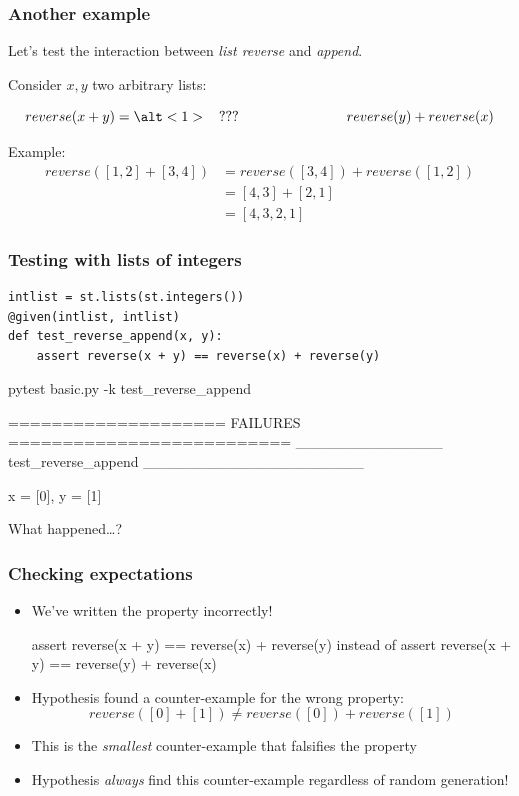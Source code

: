 \documentclass{beamer}
\begin{document}
\begin{frame}
  \frametitle{Another example}

  Let's test the interaction between \emph{list reverse}
  and \emph{append}.
  
  Consider $x, y$ two arbitrary lists:

  \[  reverse(x + y) = \alt<1>{\hspace{2ex}???\hspace{18ex}}{reverse(y) + reverse(x)} \]
  \pause

  Example:
  \[\begin{array}{ll}
      reverse([1,2] + [3,4]) &= reverse([3,4]) + reverse([1,2]) \\
                             &= [4,3] + [2,1]\\
                             &= [4,3,2,1]
  \end{array}\] 
\end{frame}

\begin{frame}[fragile]
  \frametitle{Testing with lists of integers}

\begin{verbatim}
intlist = st.lists(st.integers())
@given(intlist, intlist)
def test_reverse_append(x, y):
    assert reverse(x + y) == reverse(x) + reverse(y)
\end{verbatim}
\medskip
\pause
  
\begin{semiverbatim}
pytest basic.py -k test_reverse_append

==================== FAILURES ==========================
\alert{______________ test_reverse_append _____________________}

x = [0], y = [1]
\end{semiverbatim}
What happened\ldots ?  
\end{frame}

\begin{frame}[fragile]
  \frametitle{Checking expectations}


\begin{itemize}
\item We've written the property incorrectly!
\begin{semiverbatim}
  assert reverse(x + y) == reverse(\alert{x}) + reverse(\alert{y})
      \textsf{instead of}
  assert reverse(x + y) == reverse(y) + reverse(x)  
\end{semiverbatim}
\item Hypothesis found a counter-example for the wrong property:
   \[ reverse([0]+[1]) \neq reverse([0]) + reverse([1]) \]
\item This is the \emph{smallest} counter-example
  that falsifies the property
\item Hypothesis \emph{always} find this counter-example
  regardless of random generation!
\end{itemize}
\end{frame}
\end{document}

